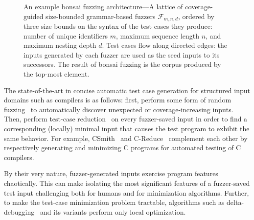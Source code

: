 \documentclass[conference]{IEEEtran}
\newcommand{\tech}{bonsai fuzzing} \newcommand{\Tech}{Bonsai fuzzing} \newcommand{\TECH}{Bonsai Fuzzing}
\begin{document}
\begin{figure}
    \centering
    \caption{An example \tech{} architecture---A lattice of coverage-guided size-bounded grammar-based fuzzers $\mathcal{F}_{m,n,d}$, ordered by three size bounds on the syntax of the test cases they produce: number of unique identifiers $m$, maximum sequence length $n$, and maximum nesting depth $d$. Test cases flow along directed edges: the inputs generated by each fuzzer are used as the seed inputs to its successors. The result of \tech{} is the corpus produced by the top-most element.}
    \label{fig:lattice}
\vspace{-0.5cm}
\end{figure}

The state-of-the-art in concise automatic test case generation for structured input domains such as compilers is as follows: first, perform some form of random fuzzing~\cite{Miller90, Godefroid20} to automatically discover unexpected or coverage-increasing inputs. Then, perform test-case reduction~\cite{Zeller02, Misherghi06} on every fuzzer-saved input in order to find a corresponding (locally) minimal input that causes the test program to exhibit the same behavior. For example, CSmith~\cite{Yang11} and C-Reduce~\cite{Regehr12} complement each other by respectively generating and minimizing C programs for automated testing of C compilers.

By their very nature, fuzzer-generated inputs exercise program features chaotically. This can make isolating the most significant features of a fuzzer-saved test input challenging both for humans and for minimization algorithms. Further, to make the test-case minimization problem tractable, algorithms such as delta-debugging~\cite{Zeller02} and its variants perform only local optimization. 
\end{document}

